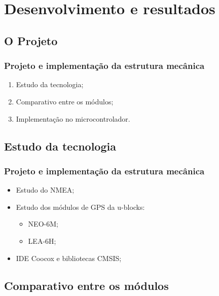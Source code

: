 \section{Desenvolvimento e resultados}


\subsection{O Projeto}

\begin{frame}
\frametitle{Projeto e implementação da estrutura mecânica}
\begin{enumerate}
\item Estudo da tecnologia;
\pause \item Comparativo entre os módulos;
\pause \item Implementação no microcontrolador.
\end{enumerate}
\end{frame}

\subsection{Estudo da tecnologia}

\begin{frame}
\frametitle{Projeto e implementação da estrutura mecânica}
\begin{itemize}
\item Estudo do NMEA;
\pause
\item Estudo dos módulos de GPS da u-blocks:
	\begin{itemize}
	\item NEO-6M;
	\item LEA-6H;
	\end{itemize}
\pause
\item IDE Coocox e bibliotecas CMSIS;
\end{itemize}
\end{frame}

\subsection{Comparativo entre os módulos}

